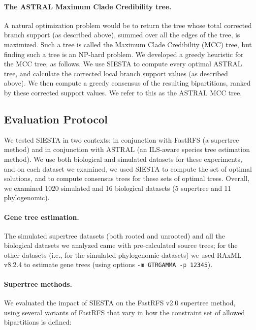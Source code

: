 \paragraph{The ASTRAL Maximum Clade Credibility tree. }


A natural optimization problem would be to return the tree whose total  corrected branch support (as described above), summed over all the edges of the tree,  is maximized. 
Such a tree is called the Maximum Clade Credibility (MCC) tree, but 
finding such a tree is an NP-hard problem.
We developed a greedy heuristic for the MCC tree, as follows.
We use SIESTA to compute every optimal ASTRAL tree, and calculate the corrected local branch support values (as described above). 
We then compute a greedy consensus of the resulting bipartitions, ranked by these corrected support values. 
We refer to this as the ASTRAL MCC tree.



\subsection{Evaluation Protocol}

We tested SIESTA  in two 
contexts: in conjunction with FastRFS (a supertree
method) 
and in
conjunction with ASTRAL (an ILS-aware
species tree estimation method).
We use both biological and simulated datasets for these
experiments, and on each dataset we examined, we used SIESTA to compute the set of optimal solutions, and to compute consensus trees for these sets of optimal trees.
Overall, we examined 1020 simulated  and  16 biological datasets (5 supertree and 11 phylogenomic).




\paragraph{Gene tree estimation. }
The  simulated supertree  datasets (both rooted and unrooted) and all the biological datasets  we analyzed came with pre-calculated source trees; for the other datasets (i.e., for the simulated phylogenomic datasets)
we used RAxML v8.2.4 \cite{Stamatakis2014} to estimate gene trees (using options \texttt{-m GTRGAMMA -p 12345}).

\paragraph{Supertree methods. }
We evaluated the impact of SIESTA on the FastRFS v2.0 supertree method, using several variants of FastRFS that vary in how the constraint set of allowed bipartitions is defined:


